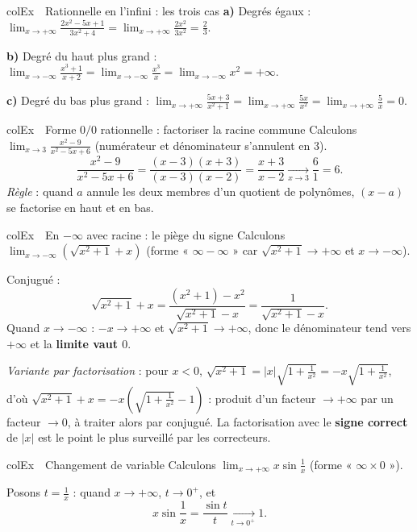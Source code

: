 \documentclass[11pt,a4paper]{article}
\newenvironment{exemple}[1][Exemple]
  {\begin{fiche}{colEx}{\ding{217}~~#1}}{\end{fiche}}
\begin{document}
\begin{exemple}[Rationnelle en l'infini : les trois cas]
\textbf{a)} Degrés égaux : $\displaystyle\lim_{x \to +\infty} \frac{2x^2 - 5x + 1}{3x^2 + 4} = \lim_{x \to +\infty}\frac{2x^2}{3x^2} = \frac{2}{3}$.

\smallskip
\textbf{b)} Degré du haut plus grand : $\displaystyle\lim_{x \to -\infty} \frac{x^3 + 1}{x + 2} = \lim_{x \to -\infty}\frac{x^3}{x} = \lim_{x \to -\infty} x^2 = +\infty$.

\smallskip
\textbf{c)} Degré du bas plus grand : $\displaystyle\lim_{x \to +\infty} \frac{5x + 3}{x^2 + 1} = \lim_{x \to +\infty}\frac{5x}{x^2} = \lim_{x \to +\infty}\frac{5}{x} = 0$.
\end{exemple}

\begin{exemple}[Forme $0/0$ rationnelle : factoriser la racine commune]
Calculons $\displaystyle\lim_{x \to 3} \frac{x^2 - 9}{x^2 - 5x + 6}$ (numérateur et dénominateur s'annulent en $3$).
\[
  \frac{x^2 - 9}{x^2 - 5x + 6}
  = \frac{(x - 3)(x + 3)}{(x - 3)(x - 2)}
  = \frac{x + 3}{x - 2}
  \xrightarrow[x \to 3]{} \frac{6}{1} = 6.
\]
\emph{Règle} : quand $a$ annule les deux membres d'un quotient de polynômes, $(x - a)$ se factorise en haut et en bas.
\end{exemple}

\begin{exemple}[En $-\infty$ avec racine : le piège du signe]
Calculons $\displaystyle\lim_{x \to -\infty} \left(\sqrt{x^2 + 1} + x\right)$ (forme « $\infty - \infty$ » car $\sqrt{x^2+1} \to +\infty$ et $x \to -\infty$).

\smallskip
Conjugué :
\[
  \sqrt{x^2 + 1} + x = \frac{(x^2 + 1) - x^2}{\sqrt{x^2 + 1} - x} = \frac{1}{\sqrt{x^2 + 1} - x}.
\]
Quand $x \to -\infty$ : $-x \to +\infty$ et $\sqrt{x^2+1} \to +\infty$, donc le dénominateur tend vers $+\infty$ et la \textbf{limite vaut $0$}.

\smallskip
\emph{Variante par factorisation} : pour $x < 0$, $\sqrt{x^2 + 1} = |x|\sqrt{1 + \frac{1}{x^2}} = -x\sqrt{1 + \frac{1}{x^2}}$, d'où $\sqrt{x^2+1} + x = -x\left(\sqrt{1 + \frac{1}{x^2}} - 1\right)$ : produit d'un facteur $\to +\infty$ par un facteur $\to 0$, à traiter alors par conjugué. La factorisation avec le \textbf{signe correct} de $|x|$ est le point le plus surveillé par les correcteurs.
\end{exemple}

\begin{exemple}[Changement de variable]
Calculons $\displaystyle\lim_{x \to +\infty} x \sin\frac{1}{x}$ (forme « $\infty \times 0$ »).

\smallskip
Posons $t = \frac{1}{x}$ : quand $x \to +\infty$, $t \to 0^+$, et
\[
  x \sin\frac{1}{x} = \frac{\sin t}{t} \xrightarrow[t \to 0^+]{} 1.
\]
\end{exemple}
\end{document}
